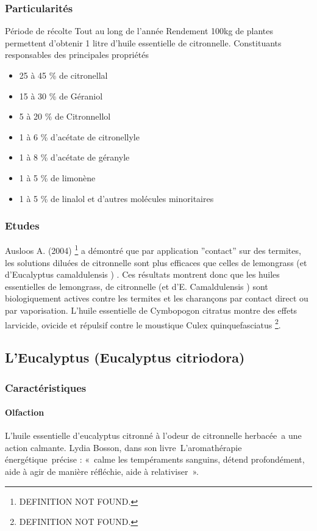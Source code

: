 \documentclass[12pt,a4wide]{article}
\begin{document}
\subsubsection{Particularités}
\label{sec-4-4-5}
Période de récolte
Tout au long de l'année
Rendement
100kg de plantes permettent d'obtenir 1 litre d'huile essentielle de citronnelle.
Constituants responsables des principales propriétés
\begin{itemize}
\item 25 à 45 \% de citronellal
\item 15 à 30 \% de Géraniol
\item 5 à 20 \% de Citronnellol
\item 1 à 6 \% d'acétate de citronellyle
\item 1 à 8 \% d'acétate de géranyle
\item 1 à 5 \% de limonène
\item 1 à 5 \% de linalol  et d'autres molécules minoritaires
\end{itemize}

\subsubsection{Etudes}
\label{sec-4-4-6}

Ausloos A. (2004) \footnote{DEFINITION NOT FOUND.} a démontré que par application ''contact'' sur des termites, les solutions diluées de citronnelle sont plus efficaces que celles de lemongrass (et  d'Eucalyptus camaldulensis ) . Ces résultats montrent donc que les huiles essentielles de lemongrass, de citronnelle (et d'E. Camaldulensis ) sont biologiquement actives contre les termites et les charançons par contact direct ou par vaporisation. 
L'huile essentielle de Cymbopogon citratus montre des effets larvicide, ovicide et répulsif contre le moustique Culex quinquefasciatus \footnote{DEFINITION NOT FOUND.}. 


\subsection{L'Eucalyptus (Eucalyptus citriodora)}
\label{sec-4-5}
\subsubsection{Caractéristiques}
\label{sec-4-5-1}
\paragraph{Olfaction}
\label{sec-4-5-1-1}
L'huile essentielle d'eucalyptus citronné à l'odeur de citronnelle herbacée a une action calmante.
Lydia Bosson, dans son livre L'aromathérapie énergétique précise : « calme les tempéraments sanguins, détend profondément, aide à agir de manière réfléchie, aide à relativiser ».
\end{document}
